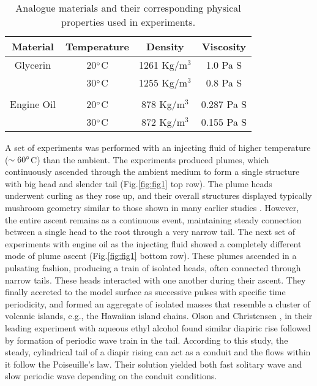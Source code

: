 \documentclass[12pt]{article}
\begin{document}
\begin{table}[htb!]
\begin{center}
\begin{tabular}{|c   c   c   c |}
\hline
Material & Temperature &  Density   & Viscosity \\
\hline
Glycerin      & 20$\degree$C  &  1261 Kg/m$^3$  & 1.0 Pa S    \\

		      & 30$\degree$C  &  1255 Kg/m$^3$  & 0.8 Pa S   \\

 &  &     &  \\


Engine Oil    & 20$\degree$C  &  878 Kg/m$^3$  & 0.287 Pa S    \\

         	  & 30$\degree$C  &  872 Kg/m$^3$  & 0.155 Pa S   \\

\hline
\end{tabular}
  \caption{\small \label{tab1} Analogue materials and their corresponding physical properties used in experiments.
}
\end{center}
\end{table}

 A set of experiments was performed with an injecting fluid of higher temperature ($\sim60\degree$C) 
than the ambient. The experiments produced plumes, which continuously ascended through the ambient medium to form a single structure with big head and slender tail (Fig.\ref{fig:fig1} top row). The plume heads underwent curling as they rose up, and their overall structures displayed typically mushroom geometry similar to those shown in many earlier studies \cite{farnetani2002mixing, davaille2005transient}. However, the entire ascent remains as a continuous event, maintaining steady connection between a single head to the root through a very narrow tail.  The next set of experiments with engine oil as the injecting fluid showed a completely different mode of plume ascent (Fig.\ref{fig:fig1} bottom row). These plumes ascended in a pulsating fashion, producing a train of isolated heads, often connected through narrow tails. These heads interacted with one another during their ascent. They finally accreted to the model surface as successive pulses with specific time periodicity, and formed an aggregate of isolated masses that resemble a cluster of volcanic islands, e.g., the Hawaiian island chains. Olson and Christensen \cite{olson1986solitary}, in their leading experiment with aqueous ethyl alcohol found similar diapiric rise followed by formation of periodic wave train in the tail. According to this study, the steady, cylindrical tail of a diapir rising can act as a conduit and the flows within it follow the Poiseuille's law. Their solution yielded both fast solitary wave and slow periodic wave depending on the conduit conditions. 
\end{document}
